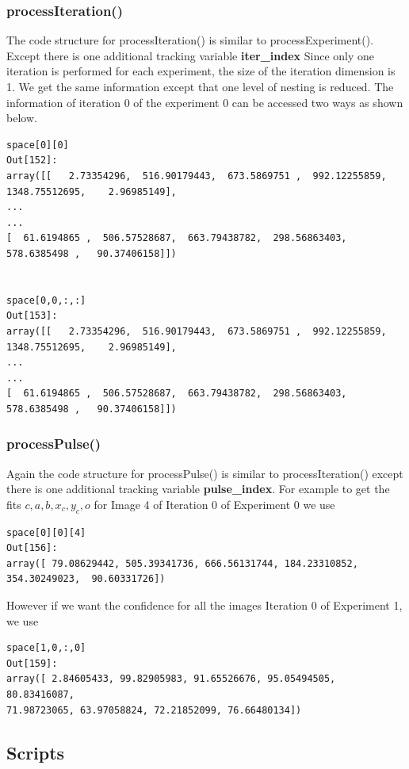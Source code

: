 \documentclass[12pt, twoside, a4paper]{article}
\begin{document}
\subsubsection{processIteration()}
The code structure for processIteration() is similar to processExperiment(). Except there is one additional tracking variable \textbf{iter\_index} Since only one iteration is performed for each experiment, the size of the iteration dimension is 1.  We get the same information except that one level of nesting is reduced. The information of iteration 0 of the  experiment 0 can be accessed two ways as shown below.
\begin{verbatim}
space[0][0]
Out[152]: 
array([[   2.73354296,  516.90179443,  673.5869751 ,  992.12255859,
1348.75512695,    2.96985149],
...
...
[  61.6194865 ,  506.57528687,  663.79438782,  298.56863403,
578.6385498 ,   90.37406158]])


space[0,0,:,:]
Out[153]: 
array([[   2.73354296,  516.90179443,  673.5869751 ,  992.12255859,
1348.75512695,    2.96985149],
...
...
[  61.6194865 ,  506.57528687,  663.79438782,  298.56863403,
578.6385498 ,   90.37406158]])
\end{verbatim}


\subsubsection{processPulse()}
Again the code structure for processPulse() is similar to processIteration() except there is one additional tracking variable \textbf{pulse\_index}. For example to get the  fits $c, a, b, x_c, y_c, o$ for Image 4 of Iteration 0 of Experiment 0 we use
\begin{verbatim}
space[0][0][4]
Out[156]: 
array([ 79.08629442, 505.39341736, 666.56131744, 184.23310852,
354.30249023,  90.60331726])
\end{verbatim}
However if we want the confidence for all the images Iteration 0 of Experiment 1, we use
\begin{verbatim}
space[1,0,:,0]
Out[159]: 
array([ 2.84605433, 99.82905983, 91.65526676, 95.05494505, 80.83416087,
71.98723065, 63.97058824, 72.21852099, 76.66480134])
\end{verbatim}
\subsection{Scripts}
\end{document}
